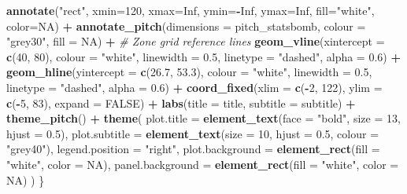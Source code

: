 \documentclass[
]{article}
\newenvironment{Shaded}{\begin{snugshade}}{\end{snugshade}}
\newcommand{\AttributeTok}[1]{\textcolor[rgb]{0.13,0.29,0.53}{#1}}
\newcommand{\CommentTok}[1]{\textcolor[rgb]{0.56,0.35,0.01}{\textit{#1}}}
\newcommand{\ConstantTok}[1]{\textcolor[rgb]{0.56,0.35,0.01}{#1}}
\newcommand{\DecValTok}[1]{\textcolor[rgb]{0.00,0.00,0.81}{#1}}
\newcommand{\FloatTok}[1]{\textcolor[rgb]{0.00,0.00,0.81}{#1}}
\newcommand{\FunctionTok}[1]{\textcolor[rgb]{0.13,0.29,0.53}{\textbf{#1}}}
\newcommand{\NormalTok}[1]{#1}
\newcommand{\SpecialCharTok}[1]{\textcolor[rgb]{0.81,0.36,0.00}{\textbf{#1}}}
\newcommand{\StringTok}[1]{\textcolor[rgb]{0.31,0.60,0.02}{#1}}
\begin{document}
\begin{Shaded}
\begin{Highlighting}[]
    \FunctionTok{annotate}\NormalTok{(}\StringTok{"rect"}\NormalTok{, }\AttributeTok{xmin=}\DecValTok{120}\NormalTok{,  }\AttributeTok{xmax=}\ConstantTok{Inf}\NormalTok{, }\AttributeTok{ymin=}\SpecialCharTok{{-}}\ConstantTok{Inf}\NormalTok{, }\AttributeTok{ymax=}\ConstantTok{Inf}\NormalTok{, }\AttributeTok{fill=}\StringTok{"white"}\NormalTok{, }\AttributeTok{color=}\ConstantTok{NA}\NormalTok{) }\SpecialCharTok{+}
    \FunctionTok{annotate\_pitch}\NormalTok{(}\AttributeTok{dimensions =}\NormalTok{ pitch\_statsbomb, }\AttributeTok{colour =} \StringTok{"grey30"}\NormalTok{, }\AttributeTok{fill =} \ConstantTok{NA}\NormalTok{) }\SpecialCharTok{+}
    \CommentTok{\# Zone grid reference lines}
    \FunctionTok{geom\_vline}\NormalTok{(}\AttributeTok{xintercept =} \FunctionTok{c}\NormalTok{(}\DecValTok{40}\NormalTok{, }\DecValTok{80}\NormalTok{), }\AttributeTok{colour =} \StringTok{"white"}\NormalTok{,}
               \AttributeTok{linewidth =} \FloatTok{0.5}\NormalTok{, }\AttributeTok{linetype =} \StringTok{"dashed"}\NormalTok{, }\AttributeTok{alpha =} \FloatTok{0.6}\NormalTok{) }\SpecialCharTok{+}
    \FunctionTok{geom\_hline}\NormalTok{(}\AttributeTok{yintercept =} \FunctionTok{c}\NormalTok{(}\FloatTok{26.7}\NormalTok{, }\FloatTok{53.3}\NormalTok{), }\AttributeTok{colour =} \StringTok{"white"}\NormalTok{,}
               \AttributeTok{linewidth =} \FloatTok{0.5}\NormalTok{, }\AttributeTok{linetype =} \StringTok{"dashed"}\NormalTok{, }\AttributeTok{alpha =} \FloatTok{0.6}\NormalTok{) }\SpecialCharTok{+}
    \FunctionTok{coord\_fixed}\NormalTok{(}\AttributeTok{xlim =} \FunctionTok{c}\NormalTok{(}\SpecialCharTok{{-}}\DecValTok{2}\NormalTok{, }\DecValTok{122}\NormalTok{), }\AttributeTok{ylim =} \FunctionTok{c}\NormalTok{(}\SpecialCharTok{{-}}\DecValTok{5}\NormalTok{, }\DecValTok{83}\NormalTok{), }\AttributeTok{expand =} \ConstantTok{FALSE}\NormalTok{) }\SpecialCharTok{+}
    \FunctionTok{labs}\NormalTok{(}\AttributeTok{title =}\NormalTok{ title, }\AttributeTok{subtitle =}\NormalTok{ subtitle) }\SpecialCharTok{+}
    \FunctionTok{theme\_pitch}\NormalTok{() }\SpecialCharTok{+}
    \FunctionTok{theme}\NormalTok{(}
      \AttributeTok{plot.title       =} \FunctionTok{element\_text}\NormalTok{(}\AttributeTok{face =} \StringTok{"bold"}\NormalTok{, }\AttributeTok{size =} \DecValTok{13}\NormalTok{, }\AttributeTok{hjust =} \FloatTok{0.5}\NormalTok{),}
      \AttributeTok{plot.subtitle    =} \FunctionTok{element\_text}\NormalTok{(}\AttributeTok{size =} \DecValTok{10}\NormalTok{, }\AttributeTok{hjust =} \FloatTok{0.5}\NormalTok{, }\AttributeTok{colour =} \StringTok{"grey40"}\NormalTok{),}
      \AttributeTok{legend.position  =} \StringTok{"right"}\NormalTok{,}
      \AttributeTok{plot.background  =} \FunctionTok{element\_rect}\NormalTok{(}\AttributeTok{fill =} \StringTok{"white"}\NormalTok{, }\AttributeTok{color =} \ConstantTok{NA}\NormalTok{),}
      \AttributeTok{panel.background =} \FunctionTok{element\_rect}\NormalTok{(}\AttributeTok{fill =} \StringTok{"white"}\NormalTok{, }\AttributeTok{color =} \ConstantTok{NA}\NormalTok{)}
\NormalTok{    )}
\NormalTok{\}}


\end{Highlighting}
\end{Shaded}
\end{document}
